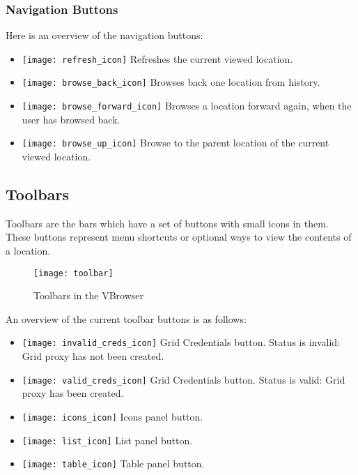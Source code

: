 \subsubsection{Navigation Buttons}

Here is an overview of the navigation buttons:

 \begin{itemize}
  \item  \texttt{[image: refresh\_icon]} 
	Refreshes the current viewed location. 
  \item  \texttt{[image: browse\_back\_icon]}
    Browses back one location from history.
  \item  \texttt{[image: browse\_forward\_icon]}
    Browses a location forward again, when the user has browsed back.
  \item  \texttt{[image: browse\_up\_icon]}
   Browse to the parent location of the current viewed location. 
   
 \end{itemize}
 
\subsection{Toolbars}
\label{section:toolbars}

 Toolbars are the bars which have a set of buttons with small icons in them. 
 These buttons represent menu shortcuts or optional ways to view the contents
 of a location. 

  \begin{figure}[htbp]
  \centerline{\texttt{[image: toolbar]}}
  \caption{Toolbars in the VBrowser}
  \label{fig:toolbars}
  \end{figure}

 An overview of the current toolbar buttons is as follows: 
 
 \begin{itemize}
 \item  \texttt{[image: invalid\_creds\_icon]}
   Grid Credentials button. Status is invalid: Grid proxy has not been
   created.
 \item  \texttt{[image: valid\_creds\_icon]}
    Grid Credentials button. Status is valid: Grid proxy has been created.
 \item  \texttt{[image: icons\_icon]}
   Icons panel button.
 \item  \texttt{[image: list\_icon]}
   List panel button. 
 \item  \texttt{[image: table\_icon]}
   Table panel button. 
\end{itemize}
  
